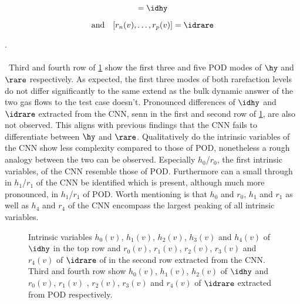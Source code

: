\begin{minipage}{0.45\textwidth}
	\begin{equation}
	[h_1(v),\dots,h_p(v)] = \idhy
	\end{equation}
\end{minipage}%
\begin{minipage}{0.45\textwidth}
	\begin{equation}
	\mathrm{and}\quad[r_n(v),\dots,r_p(v)] = \idrare
	\end{equation}
\end{minipage}.\\\\\
Third and fourth row of \cref{Fig: CNNPOD} show the first three and five POD modes of \(\hy\) and \(\rare\) respectively. As expected, the first three modes of both rarefaction levels do not differ significantly to the same extend as the bulk dynamic answer of the two gas flows to the test case doesn't. Pronounced differences of \(\idhy\) and \(\idrare\) extracted from the CNN, senn in the first and second row of \cref{Fig: CNNPOD}, are also not observed. This aligns with previous findings that the CNN fails to differentiate between \(\hy\) and \(\rare\). Qualitatively do the intrinsic variables of the CNN show less complexity compared to those of POD, nonetheless a rough analogy between the two can be observed. Especially \(h_0\)/\(r_0\), the first intrinsic variables, of the CNN resemble those of POD. Furthermore can a small through in \(h_1\)/\(r_1\) of the CNN be identified which is present, although much more pronounced, in \(h_1\)/\(r_1\) of POD. Worth mentioning is that \(h_0\) and \(r_0\), \(h_1\) and \(r_1\) as well as \(h_4\) and \(r_4\) of the CNN encompass the largest peaking of all intrinsic variables.\\    
\begin{figure}[hp!]
	
	\caption{Intrinsic variables \(h_0(v)\), \(h_1(v)\), \(h_2(v)\), \(h_3(v)\) and \(h_4(v)\) of \(\idhy\) in the top row and \(r_0(v)\), \(r_1(v)\), \(r_2(v)\), \(r_3(v)\) and \(r_4(v)\) of \(\idrare\) of in the second row extracted from the CNN. Third and fourth row show \(h_0(v)\), \(h_1(v)\), \(h_2(v)\) of \(\idhy\) and \(r_0(v)\), \(r_1(v)\) , \(r_2(v)\), \(r_3(v)\) and \(r_4(v)\) of \(\idrare\) extracted from POD respectively.}
	\label{Fig: CNNPOD}
\end{figure}


